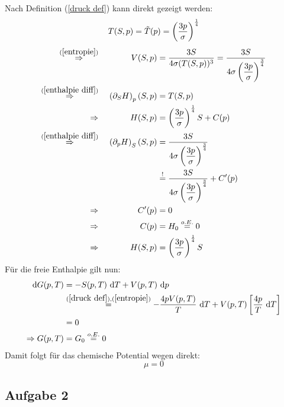 			Nach Definition (\ref{druck def}) kann direkt gezeigt werden:
			\begin{equation*}
				T(S,p) = \tilde{T}(p) = \left(  \dfrac{3p}{\sigma}  \right)^{\frac{1}{4}}
			\end{equation*}
			\begin{alignat}{3}
				\overset{(\ref{entropie})}{\Rightarrow}&& \ V(S,p) &= \dfrac{3S}{4\sigma (T(S,p))^3} = \dfrac{3S}{4\sigma \curvb{ \dfrac{3p}{\sigma} }^{\frac{3}{4}}} \nonumber \\
				\overset{(\ref{enthalpie diff})}{\Rightarrow}&& \ \curvb{ \partial_S H }_p(S,p) &= T(S,p) \nonumber \\
				\Rightarrow&& \ H(S,p) &= \curvb{\dfrac{3p}{\sigma}}^{\frac{1}{4}}S + C(p) \nonumber \\
				\overset{(\ref{enthalpie diff})}{\Rightarrow}&& \ \curvb{ \partial_p H }_S(S,p) &= \dfrac{3S}{4\sigma \curvb{ \dfrac{3p}{\sigma} }^{\frac{3}{4}}} \nonumber \\
				&& &\overset{!}{=} \dfrac{3S}{4\sigma \curvb{ \dfrac{3p}{\sigma} }^{\frac{3}{4}}} + C^\prime(p) \nonumber \\
				\Rightarrow&& \ C^\prime(p) &= 0 \nonumber \\
				\Rightarrow&& \ C(p) &= H_0 \overset{o.E.}{=} 0 \nonumber \\
				\label{freie energie pot}
				\Rightarrow&& \ H(S,p) &= \curvb{\dfrac{3p}{\sigma}}^{\frac{1}{4}}S
			\end{alignat}
			Für die freie Enthalpie gilt nun:
			\begin{alignat}{3}
				\label{freie enthalpie diff}
				\mathrm{d} G(p,T) &= -S(p,T)\ \mathrm{d} T + V(p,T)\ \mathrm{d} p \\
				&\overset{(\ref{druck def}), (\ref{entropie})}{=} -\dfrac{4pV(p,T)}{T}\ \mathrm{d} T + V(p,T)\left[  \dfrac{4p}{T} \ \mathrm{d} T  \right] \nonumber \\
				&= 0 \nonumber \\
				\label{freie enthalpie pot}
				\Rightarrow G(p,T) &= G_0 \overset{o.E.}{=} 0
			\end{alignat}
			Damit folgt für das chemische Potential wegen  direkt:
			\begin{equation}
				\label{chemisches pot}
				\mu = 0
			\end{equation}


		\newpage

		\subsection*{Aufgabe 2} %
		\label{sub:aufgabe_2}
		

